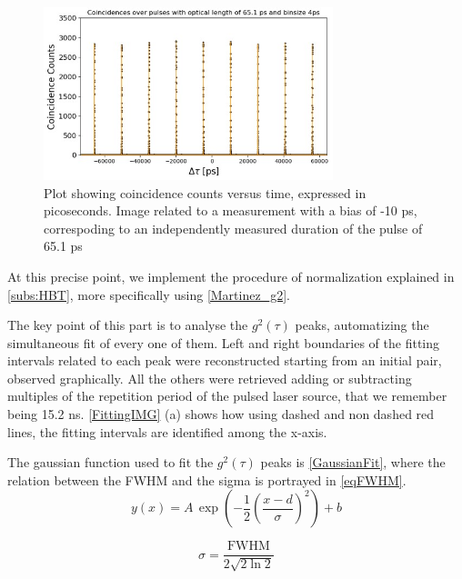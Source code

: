 \begin{figure}[hbtp]
\centering
\includegraphics[width=0.75\textwidth]{CoincidenceExample.jpg}
\caption{Plot showing coincidence counts versus time, expressed in picoseconds. Image related to a measurement with a bias of -10 ps, correspoding to an independently measured duration of the pulse of 65.1 ps}
\label{CoincidenceCounts}
\end{figure}



At this precise point, we implement the procedure of normalization explained in  \autoref{subs:HBT}, more specifically using \autoref{Martinez_g2}.

The key point of this part is to analyse the $g^2 (\tau)$ peaks, automatizing the simultaneous fit of every one of them.
Left and right boundaries of the fitting intervals related to each peak were reconstructed starting from an initial pair, observed graphically.
All the others were retrieved adding or subtracting multiples of the repetition period of the pulsed laser source, that we remember being 15.2 ns.
\autoref{FittingIMG} (a) shows how using dashed and non dashed red lines, the fitting intervals are identified among the x-axis.

The gaussian function used to fit the $g^2 (\tau)$ peaks is \autoref{GaussianFit}, where the relation between the FWHM and the sigma is portrayed in \autoref{eqFWHM}. 
\begin{equation}
y(x) = A \, \exp\!\left( -\frac{1}{2} \left( \frac{x - d}{\sigma} \right)^{2} \right) + b
\label{GaussianFit}
\end{equation}

\begin{equation}
\sigma = \frac{\mathrm{FWHM}}{2 \sqrt{2 \ln 2}}
\label{eqFWHM}
\end{equation}

